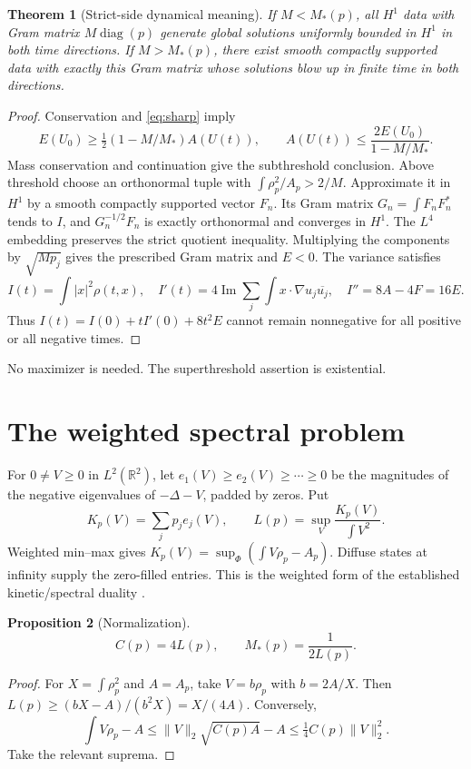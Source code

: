 \documentclass[11pt,a4paper]{article}
\newtheorem{theorem}{Theorem}
\newtheorem{proposition}[theorem]{Proposition}
\newcommand{\R}{\mathbb R}
\begin{document}
\begin{theorem}[Strict-side dynamical meaning]\label{thm:strict}
If $M<M_*(p)$, all $H^1$ data with Gram matrix $M\operatorname{diag}(p)$ generate global solutions uniformly bounded in $H^1$ in both time directions. If $M>M_*(p)$, there exist smooth compactly supported data with exactly this Gram matrix whose solutions blow up in finite time in both directions.
\end{theorem}
\begin{proof}
Conservation and \eqref{eq:sharp} imply
\[
 E(U_0)\ge\tfrac12(1-M/M_*)A(U(t)),\qquad
 A(U(t))\le\frac{2E(U_0)}{1-M/M_*}.
\]
Mass conservation and continuation give the subthreshold conclusion. Above threshold choose an orthonormal tuple with $\int\rho_p^2/A_p>2/M$. Approximate it in $H^1$ by a smooth compactly supported vector $F_n$. Its Gram matrix $G_n=\int F_nF_n^*$ tends to $I$, and $G_n^{-1/2}F_n$ is exactly orthonormal and converges in $H^1$. The $L^4$ embedding preserves the strict quotient inequality. Multiplying the components by $\sqrt{Mp_j}$ gives the prescribed Gram matrix and $E<0$. The variance satisfies
\[
 I(t)=\int |x|^2\rho(t,x),\quad
 I'(t)=4\operatorname{Im}\sum_j\int x\cdot\nabla u_j\overline{u_j},\quad
 I''=8A-4F=16E.
\]
Thus $I(t)=I(0)+tI'(0)+8t^2E$ cannot remain nonnegative for all positive or all negative times.
\end{proof}
No maximizer is needed. The superthreshold assertion is existential.

\section{The weighted spectral problem}
For $0\ne V\ge0$ in $L^2(\R^2)$, let $e_1(V)\ge e_2(V)\ge\cdots\ge0$ be the magnitudes of the negative eigenvalues of $-\Delta-V$, padded by zeros. Put
\[
 K_p(V)=\sum_jp_je_j(V),\qquad L(p)=\sup_V\frac{K_p(V)}{\int V^2}.
\]
Weighted min--max gives $K_p(V)=\sup_\Phi(\int V\rho_p-A_p)$. Diffuse states at infinity supply the zero-filled entries. This is the weighted form of the established kinetic/spectral duality \cite{DFLP,FGL}.
\begin{proposition}[Normalization]
\[
 C(p)=4L(p),\qquad M_*(p)=\frac1{2L(p)}.
\]
\end{proposition}
\begin{proof}
For $X=\int\rho_p^2$ and $A=A_p$, take $V=b\rho_p$ with $b=2A/X$. Then $L(p)\ge(bX-A)/(b^2X)=X/(4A)$. Conversely,
\[
 \int V\rho_p-A\le\|V\|_2\sqrt{C(p)A}-A\le\tfrac14C(p)\|V\|_2^2.
\]
Take the relevant suprema.
\end{proof}
\end{document}
